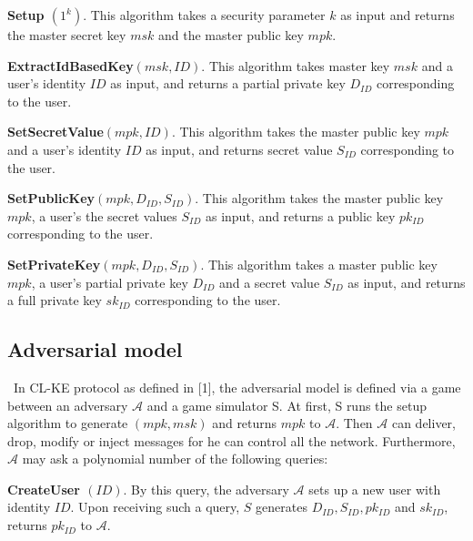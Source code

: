 \documentclass[final,1p,times,twocolumn]{elsarticle}
\begin{document}
{\bf Setup $(1^{k})$}. This algorithm takes a security parameter $k$ as input and returns the master secret key $msk$ and the master public key $mpk$.

\vspace{0.2cm}

{\bf ExtractIdBasedKey$(msk,ID)$}. This algorithm takes master key $msk$ and a user's identity $ID$ as input, and returns a partial private key $D_{ID}$ corresponding to the user.

\vspace{0.2cm}

{\bf SetSecretValue$(mpk,ID)$}. This algorithm takes the master public key $mpk$ and a user's identity $ID$ as input, and returns secret value $S_{ID}$ corresponding to the user.

\vspace{0.2cm}

{\bf SetPublicKey$(mpk,D_{ID},S_{ID})$}. This algorithm takes the master public key $mpk$, a user's the secret values $S_{ID}$ as input, and returns a public key $pk_{ID}$ corresponding to the user.

\vspace{0.2cm}

{\bf SetPrivateKey$(mpk,D_{ID},S_{ID})$}. This algorithm takes a master public key $mpk$, a user's partial private key $D_{ID}$ and a  secret value $S_{ID}$ as input, and returns a full private key $sk_{ID}$ corresponding to the user.


\vspace{0.3cm}

\subsection{Adversarial model}
\label{2.2}

\ In CL-KE protocol as defined in [1], the adversarial model is defined via a game between an adversary $\mathcal{A}$ and a game simulator S. At first, S runs the setup algorithm to generate $(mpk,msk)$ and returns $mpk$ to $\mathcal{A}$. Then $\mathcal{A}$ can deliver, drop, modify or inject messages for he can control all the network. Furthermore, $\mathcal{A}$ may ask a polynomial number of the following queries:

\vspace{0.2cm}

{\bf CreateUser $(ID)$}. By this query, the adversary $\mathcal{A}$ sets up a new user with identity $ID$. Upon receiving such a query, $S$ generates $D_{ID},S_{ID},pk_{ID}$ and $sk_{ID}$, returns $pk_{ID}$ to $\mathcal{A}$.
\end{document}
